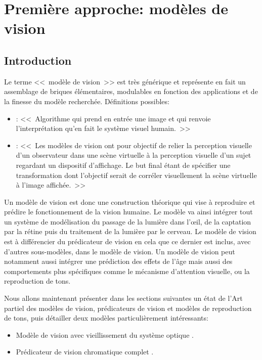 \part{Première approche: modèles de vision}
	\chapter*{Introduction}
	\par Le terme <<~modèle de vision~>> est très générique et représente en fait un assemblage de briques élémentaires, modulables en fonction des applications et de la finesse du modèle recherchée. Définitions possibles:
	\begin{itemize}
		\item \citep{moreau_traite_2006}: <<~Algorithme qui prend en entrée une image et qui renvoie l'interprétation qu'en fait le système visuel humain.~>>
		\item \citep{pattanaik_multiscale_1998}: <<~Les modèles de vision ont pour objectif de relier la perception visuelle d'un observateur dans une scène virtuelle à la perception visuelle d'un sujet regardant un dispositif d'affichage. Le but final étant de spécifier une transformation dont l'objectif serait de corréler visuellement la scène virtuelle à l'image affichée.~>>
	\end{itemize}
	
	\par Un modèle de vision est donc une construction théorique qui vise à reproduire et prédire le fonctionnement de la vision humaine. Le modèle va ainsi intégrer tout un système de modélisation du passage de la lumière dans l'œil, de la captation par la rétine puis du traitement de la lumière par le cerveau. Le modèle de vision est à différencier du prédicateur de vision en cela que ce dernier est inclus, avec d'autres sous-modèles, dans le modèle de vision. Un modèle de vision peut notamment aussi intégrer une prédiction des effets de l'âge mais aussi des comportements plus spécifiques comme le mécanisme d'attention visuelle, ou la reproduction de tons.
	
	\par Nous allons maintenant présenter dans les sections suivantes un état de l'Art partiel des modèles de vision, prédicateurs de vision et modèles de reproduction de tons, puis détailler deux modèles particulièrement intéressants:
	\begin{itemize}
		\item Modèle de vision avec vieillissement du système optique \citep{mantiuk_human_2015}.
		\item Prédicateur de vision chromatique complet \citep{pattanaik_multiscale_1998}.
	\end{itemize}
	
